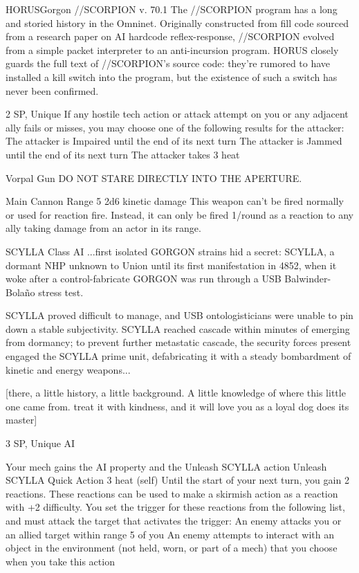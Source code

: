 \begin{mech}{HORUS}{Gorgon}
//SCORPION v. 70.1
The //SCORPION program has a long and storied history in the Omninet. Originally constructed from fill code sourced from a research paper on AI hardcode reflex-response, //SCORPION evolved from a simple packet interpreter to an anti-incursion program. HORUS closely guards the full text of //SCORPION’s source code: they’re rumored to have installed a kill switch into the program, but the existence of such a switch has never been confirmed.

2 SP, Unique
If any hostile tech action or attack attempt on you or any adjacent ally fails or misses, you may choose one of the following results for the attacker:
The attacker is Impaired until the end of its next turn
The attacker is Jammed until the end of its next turn
The attacker takes 3 heat

Vorpal Gun
DO NOT STARE DIRECTLY INTO THE APERTURE.

Main Cannon
Range 5
2d6 kinetic damage
This weapon can’t be fired normally or used for reaction fire. Instead, it can only be fired 1/round as a reaction to any ally taking damage from an actor in its range.

SCYLLA Class AI
...first isolated GORGON strains hid a secret: SCYLLA, a dormant NHP unknown to Union until its first manifestation in 4852, when it woke after a control-fabricate GORGON was run through a USB Balwinder-Bolaño stress test.

SCYLLA proved difficult to manage, and USB ontologisticians were unable to pin down a stable subjectivity. SCYLLA reached cascade within minutes of emerging from dormancy; to prevent further metastatic cascade, the security forces present engaged the SCYLLA prime unit, defabricating it with a steady bombardment of kinetic and energy weapons...

[there, a little history, a little background. A little knowledge of where this little one came from. treat it with kindness, and it will love you as a loyal dog does its master]

3 SP, Unique
AI

Your mech gains the AI property and the Unleash SCYLLA action
Unleash SCYLLA
Quick Action
  	3 heat (self)
Until the start of your next turn, you gain 2 reactions. These reactions can be used to make a skirmish action as a reaction with +2 difficulty. You set the trigger for these reactions from the following list, and must attack the target that activates the trigger:
An enemy attacks you or an allied target within range 5 of you
An enemy attempts to interact with an object in the environment (not held, worn, or part of a mech) that you choose when you take this action


\end{mech}
